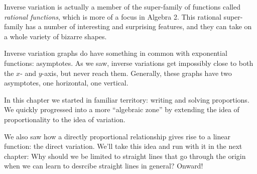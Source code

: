 Inverse variation is actually a member of the super-family of functions called \textit{rational functions}, which is more of a focus in Algebra 2. This rational super-family has a number of interesting and surprising features, and they can take on a whole variety of bizarre shapes.

Inverse variation graphs do have something in common with exponential functions: asymptotes. As we saw, inverse variations get impossibly close to both the $x$- and $y$-axis, but never reach them. Generally, these graphs have two asymptotes, one horizontal, one vertical.

\chaptersummary

In this chapter we started in familiar territory: writing and solving proportions. We quickly progressed into a more ``algebraic zone'' by extending the idea of proportionality to the idea of variation.

We also saw how a directly proportional relationship gives rise to a linear function: the direct variation. We'll take this idea and run with it in the next chapter: Why should we be limited to straight lines that go through the origin when we can learn to desrcibe straight lines in general? Onward!
